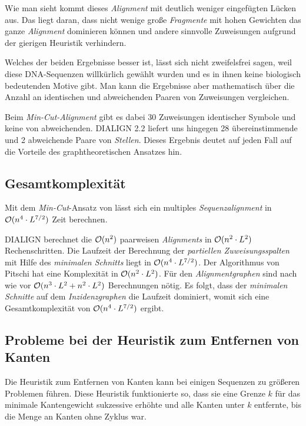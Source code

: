 Wie man sieht kommt dieses \emph{Alignment} mit deutlich weniger eingefügten Lücken aus. Das liegt daran, dass nicht wenige große \emph{Fragmente} mit hohen Gewichten das ganze \emph{Alignment} dominieren können und andere sinnvolle Zuweisungen aufgrund der gierigen Heuristik verhindern.

Welches der beiden Ergebnisse besser ist, lässt sich nicht zweifelsfrei sagen, weil diese DNA-Sequenzen willkürlich gewählt wurden und es in ihnen keine biologisch bedeutenden Motive gibt. Man kann die Ergebnisse aber mathematisch über die Anzahl an identischen und abweichenden Paaren von Zuweisungen vergleichen.

Beim \emph{Min-Cut-Alignment} gibt es dabei 30 Zuweisungen identischer Symbole und keine von abweichenden. DIALIGN 2.2 liefert uns hingegen 28 übereinstimmende und 2 abweichende Paare von \emph{Stellen}. Dieses Ergebnis deutet auf jeden Fall auf die Vorteile des graphtheoretischen Ansatzes hin. 
 
\subsection{Gesamtkomplexität}

\begin{korollar}
	Mit dem \emph{Min-Cut}-Ansatz von \cite{cpm10} lässt sich ein multiples \emph{Sequenzalignment} in $\mathcal{O}(n^4\cdot L^{7/2})$ Zeit berechnen.
\end{korollar}

\begin{beweis}
	DIALIGN berechnet die $\mathcal{O}(n^2)$ paarweisen \emph{Alignments} in $\mathcal{O}(n^2\cdot L^2)$ Rechenschritten. Die Laufzeit der Berechnung der \emph{partiellen Zuweisungsspalten} mit Hilfe des \emph{minimalen Schnitts} liegt in $\mathcal{O}(n^4\cdot L^{7/2})$. Der Algorithmus von Pitschi hat eine Komplexität in $\mathcal{O}(n^2\cdot L^2)$. Für den \emph{Alignmentgraphen} sind nach wie vor $\mathcal{O}(n^3\cdot L^2 + n^2\cdot L^2)$ Berechnungen nötig. Es folgt, dass der \emph{minimalen Schnitte} auf dem \emph{Inzidenzgraphen} die Laufzeit dominiert, womit sich eine Gesamtkomplexität von $\mathcal{O}(n^4\cdot L^{7/2})$ ergibt.
\end{beweis}

\subsection{Probleme bei der Heuristik zum Entfernen von Kanten}

Die Heuristik zum Entfernen von Kanten kann bei einigen Sequenzen zu größeren Problemen führen. Diese Heuristik funktionierte so, dass sie eine Grenze $k$ für das minimale Kantengewicht sukzessive erhöhte und alle Kanten unter $k$ entfernte, bis die Menge an Kanten ohne Zyklus war. 

